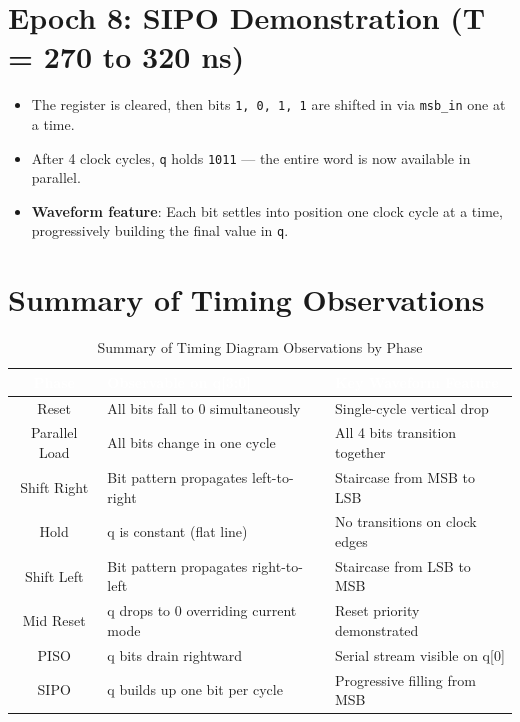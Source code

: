 \documentclass[12pt,a4paper]{report}
\newcommand{\signal}[1]{\texttt{\textcolor{codeblue}{#1}}}
\begin{document}
\section{Epoch 8: SIPO Demonstration (T = 270 to 320 ns)}

\begin{itemize}
    \item The register is cleared, then bits \texttt{1, 0, 1, 1} are shifted in via \signal{msb\_in} one at a time.
    \item After 4 clock cycles, \signal{q} holds \texttt{1011} — the entire word is now available in parallel.
    \item \textbf{Waveform feature}: Each bit settles into position one clock cycle at a time, progressively building the final value in \signal{q}.
\end{itemize}

\section{Summary of Timing Observations}

\begin{table}[H]
\centering
\caption{Summary of Timing Diagram Observations by Phase}
\renewcommand{\arraystretch}{1.4}
\begin{tabularx}{\textwidth}{cXX}
    \toprule
    \rowcolor{tableheader}
    \textcolor{white}{\textbf{Phase}} &
    \textcolor{white}{\textbf{Observable on q[3:0]}} &
    \textcolor{white}{\textbf{Key Waveform Feature}} \\
    \midrule
    Reset       & All bits fall to 0 simultaneously & Single-cycle vertical drop \\
    \rowcolor{lightgray}
    Parallel Load & All bits change in one cycle & All 4 bits transition together \\
    Shift Right & Bit pattern propagates left-to-right & Staircase from MSB to LSB \\
    \rowcolor{lightgray}
    Hold        & q is constant (flat line) & No transitions on clock edges \\
    Shift Left  & Bit pattern propagates right-to-left & Staircase from LSB to MSB \\
    \rowcolor{lightgray}
    Mid Reset   & q drops to 0 overriding current mode & Reset priority demonstrated \\
    PISO        & q bits drain rightward & Serial stream visible on q[0] \\
    \rowcolor{lightgray}
    SIPO        & q builds up one bit per cycle & Progressive filling from MSB \\
    \bottomrule
\end{tabularx}
\label{tab:timingsummary}
\end{table}
\end{document}
